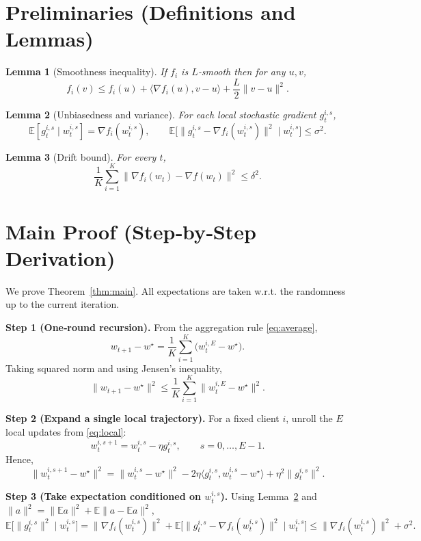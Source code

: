\documentclass{article}
\newtheorem{lemma}{Lemma}
\begin{document}
\newpage
\section*{Preliminaries (Definitions and Lemmas)}
\begin{lemma}[Smoothness inequality]\label{lem:smooth}
If $f_i$ is $L$‑smooth then for any $u,v$,
\[
f_i(v)\le f_i(u)+\langle\nabla f_i(u),v-u\rangle+\frac{L}{2}\|v-u\|^2 .
\]
\end{lemma}
\begin{lemma}[Unbiasedness and variance]\label{lem:unbiased}
For each local stochastic gradient $g_{t}^{i,s}$,
\[
\mathbb{E}[g_{t}^{i,s}\mid w_{t}^{i,s}]=\nabla f_i(w_{t}^{i,s}),\qquad
\mathbb{E}\!\bigl[\|g_{t}^{i,s}-\nabla f_i(w_{t}^{i,s})\|^2\mid w_{t}^{i,s}\bigr]\le\sigma^2 .
\]
\end{lemma}
\begin{lemma}[Drift bound]\label{lem:drift}
For every $t$,
\[
\frac1K\sum_{i=1}^{K}\|\nabla f_i(w_t)-\nabla f(w_t)\|^2\le\delta^2 .
\]
\end{lemma}

\newpage
\section*{Main Proof (Step‑by‑Step Derivation)}
We prove Theorem~\ref{thm:main}.  All expectations are taken w.r.t. the
randomness up to the current iteration.

\noindent\textbf{Step 1 (One‑round recursion).}  
From the aggregation rule \eqref{eq:average},
\[
w_{t+1}-w^\star
= \frac1K\sum_{i=1}^{K}\bigl(w_{t}^{i,E}-w^\star\bigr).
\]
Taking squared norm and using Jensen’s inequality,
\[
\|w_{t+1}-w^\star\|^2
\le \frac1K\sum_{i=1}^{K}\|w_{t}^{i,E}-w^\star\|^2 .
\tag{1}
\]

\noindent\textbf{Step 2 (Expand a single local trajectory).}  
For a fixed client $i$, unroll the $E$ local updates from \eqref{eq:local}:
\[
w_{t}^{i,s+1}=w_{t}^{i,s}-\eta g_{t}^{i,s},
\qquad s=0,\dots ,E-1 .
\]
Hence,
\[
\|w_{t}^{i,s+1}-w^\star\|^2
= \|w_{t}^{i,s}-w^\star\|^2
-2\eta\langle g_{t}^{i,s},w_{t}^{i,s}-w^\star\rangle
+\eta^2\|g_{t}^{i,s}\|^2 .
\tag{2}
\]

\noindent\textbf{Step 3 (Take expectation conditioned on $w_{t}^{i,s}$).}  
Using Lemma~\ref{lem:unbiased} and $\|a\|^2=\|\mathbb{E}a\|^2+\mathbb{E}\|a-\mathbb{E}a\|^2$,
\[
\mathbb{E}\!\bigl[\|g_{t}^{i,s}\|^2\mid w_{t}^{i,s}\bigr]
= \|\nabla f_i(w_{t}^{i,s})\|^2+\mathbb{E}\!\bigl[\|g_{t}^{i,s}-\nabla f_i(w_{t}^{i,s})\|^2\mid w_{t}^{i,s}\bigr]
\le \|\nabla f_i(w_{t}^{i,s})\|^2+\sigma^2 .
\tag{3}
\]
\end{document}
